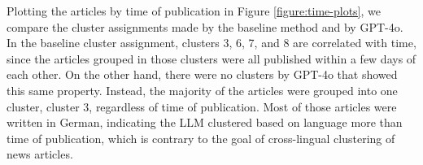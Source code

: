 


Plotting the articles by time of publication in Figure \ref{figure:time-plots}, we compare the cluster assignments made by the baseline method and by GPT-4o.
In the baseline cluster assignment, clusters 3, 6, 7, and 8 are correlated with time, since the articles grouped in those clusters were all published within a few days of each other.
On the other hand, there were no clusters by GPT-4o that showed this same property.
Instead, the majority of the articles were grouped into one cluster, cluster 3, regardless of time of publication.
Most of those articles were written in German, indicating the LLM clustered based on language more than time of publication, which is contrary to the goal of cross-lingual clustering of news articles.



